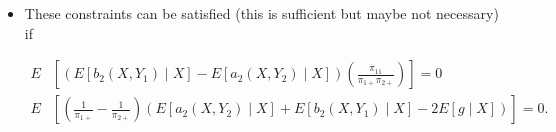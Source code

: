 \documentclass[12pt]{article}
\begin{document}
\begin{itemize}
  \item These constraints can be satisfied (this is sufficient but maybe not
    necessary) if 

    \begin{align*}
      E&\left[(E[b_2(X, Y_1) \mid X] - E[a_2(X, Y_2) \mid X])
      \left(\frac{\pi_{11}}{\pi_{1+} \pi_{2+}}\right) \right] = 0\\
      E&\left[\left(\frac{1}{\pi_{1+}} - \frac{1}{\pi_{2+}}\right)(E[a_2(X, Y_2)
      \mid X] + E[b_2(X, Y_1) \mid X] - 2E[g \mid X])\right] = 0.
    \end{align*}

\end{itemize}


%

\newpage





\printbibliography
\end{document}
